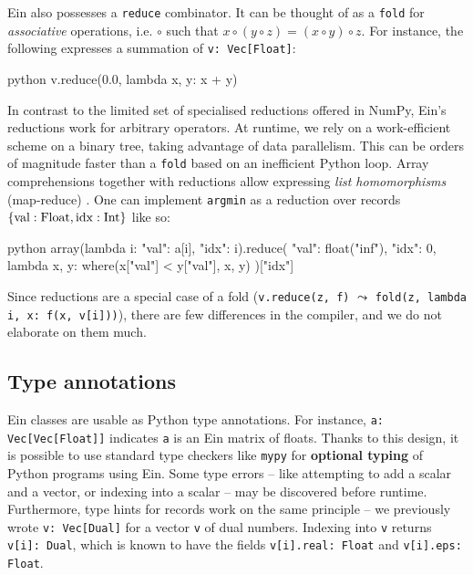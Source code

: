 Ein also possesses a \texttt{reduce} combinator. 
It can be thought of as a \texttt{fold} for \textit{associative} operations, i.e. $\circ$ such that $x \circ (y \circ z) = (x \circ y) \circ z$. 
For instance, the following expresses a summation of \texttt{v: Vec[Float]}:
\begin{center}
\begin{cminted}{python}
v.reduce(0.0, lambda x, y: x + y)
\end{cminted}
\end{center}
In contrast to the limited set of specialised reductions offered in NumPy, Ein's reductions work for arbitrary operators.
At runtime, we rely on a work-efficient scheme on a binary tree, taking advantage of data parallelism. This can be orders of magnitude faster than a \texttt{fold} based on an inefficient Python loop. Array comprehensions together with reductions allow expressing \textit{list homomorphisms} (map-reduce) \cite{cole1993parallel}. One can implement \texttt{argmin} as a reduction over records $\{ \mathrm{val} : \mathrm{Float}, \mathrm{idx}: \mathrm{Int} \}$ like so:
\begin{center}
\begin{cminted}{python}
array(lambda i: {"val": a[i], "idx": i}).reduce(
  {"val": float("inf"), "idx": 0},
  lambda x, y: where(x["val"] < y["val"], x, y)
)["idx"]
\end{cminted}
\end{center}


Since reductions are a special case of a fold (\texttt{v.reduce(z, f)} $\leadsto$ \texttt{fold(z, lambda i, x: f(x, v[i]))}), there are few differences in the compiler, and we do not elaborate on them much.


\subsection{Type annotations}
\label{type-annotations}

Ein classes are usable as Python type annotations. 
For instance, \texttt{a: Vec[Vec[Float]]} indicates \texttt{a} is an Ein matrix of floats. Thanks to this design, it is possible to use standard type checkers like \texttt{mypy} for \textbf{optional typing} of Python programs using Ein. Some type errors -- like attempting to add a scalar and a vector, or indexing into a scalar -- may be discovered before runtime. Furthermore, type hints for records work on the same principle -- we previously wrote \texttt{v: Vec[Dual]} for a vector \texttt{v} of dual numbers. Indexing into \texttt{v} returns \texttt{v[i]: Dual}, which is known to have the fields \texttt{v[i].real: Float} and \texttt{v[i].eps: Float}.

